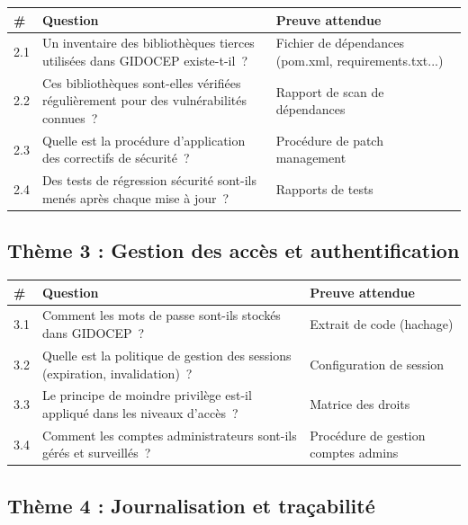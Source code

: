 \documentclass[12pt,a4paper,oneside]{report}
\begin{document}
\begin{longtable}{|p{0.5cm}|p{8cm}|p{5cm}|}
\hline
\rowcolor{theadcolor}
\color{white}\textbf{\#} &
\color{white}\textbf{Question} &
\color{white}\textbf{Preuve attendue} \\
\hline\endhead\hline\endfoot
\rowcolor{trow1}
2.1 & Un inventaire des biblioth\`eques tierces utilis\'ees dans GIDOCEP existe-t-il~? &
  Fichier de d\'ependances (pom.xml, requirements.txt...) \\
\hline\rowcolor{trow2}
2.2 & Ces biblioth\`eques sont-elles v\'erifi\'ees r\'eguli\`erement pour des vuln\'erabilit\'es connues~? &
  Rapport de scan de d\'ependances \\
\hline\rowcolor{trow1}
2.3 & Quelle est la proc\'edure d'application des correctifs de s\'ecurit\'e~? &
  Proc\'edure de patch management \\
\hline\rowcolor{trow2}
2.4 & Des tests de r\'egression s\'ecurit\'e sont-ils men\'es apr\`es chaque mise \`a jour~? &
  Rapports de tests \\
\hline
\end{longtable}

\subsection*{Th\`eme 3 : Gestion des acc\`es et authentification}

\begin{longtable}{|p{0.5cm}|p{8cm}|p{5cm}|}
\hline
\rowcolor{theadcolor}
\color{white}\textbf{\#} &
\color{white}\textbf{Question} &
\color{white}\textbf{Preuve attendue} \\
\hline\endhead\hline\endfoot
\rowcolor{trow1}
3.1 & Comment les mots de passe sont-ils stock\'es dans GIDOCEP~? &
  Extrait de code (hachage) \\
\hline\rowcolor{trow2}
3.2 & Quelle est la politique de gestion des sessions (expiration, invalidation)~? &
  Configuration de session \\
\hline\rowcolor{trow1}
3.3 & Le principe de moindre privil\`ege est-il appliqu\'e dans les niveaux d'acc\`es~? &
  Matrice des droits \\
\hline\rowcolor{trow2}
3.4 & Comment les comptes administrateurs sont-ils g\'er\'es et surveill\'es~? &
  Proc\'edure de gestion comptes admins \\
\hline
\end{longtable}

\subsection*{Th\`eme 4 : Journalisation et tra\c{c}abilit\'e}
\end{document}
